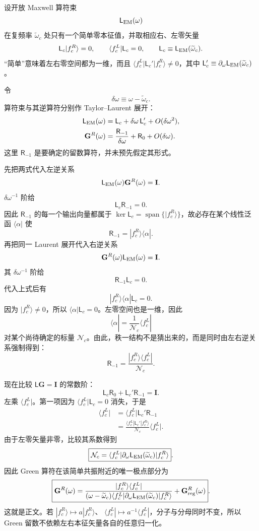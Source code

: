 \begin{derivation}
设开放 Maxwell 算符束
\[
\mathsf L_{\rm EM}(\omega)
\]
在复频率 \(\widetilde\omega_c\) 处只有一个简单零本征值，并取相应右、左零矢量
\[
\mathsf L_c|f_c^R\rangle=0,
\qquad
\langle f_c^L|\mathsf L_c=0,
\qquad
\mathsf L_c\equiv\mathsf L_{\rm EM}(\widetilde\omega_c).
\]
“简单”意味着左右零空间都为一维，而且
\(\langle f_c^L|\mathsf L_c'|f_c^R\rangle\neq0\)，其中
\(\mathsf L_c'\equiv\partial_\omega\mathsf L_{\rm EM}(\widetilde\omega_c)\)。

令
\[
\delta\omega\equiv\omega-\widetilde\omega_c.
\]
算符束与其逆算符分别作 Taylor--Laurent 展开：
\begin{align*}
\mathsf L_{\rm EM}(\omega)
&=\mathsf L_c+\delta\omega\,\mathsf L_c'
+O(\delta\omega^2),\\
\mathbf G^R(\omega)
&=\frac{\mathsf R_{-1}}{\delta\omega}
+\mathsf R_0+O(\delta\omega).
\end{align*}
这里 \(\mathsf R_{-1}\) 是要确定的留数算符，并未预先假定其形式。

先把两式代入左逆关系
\[
\mathsf L_{\rm EM}(\omega)\mathbf G^R(\omega)=\mathbf I.
\]
\(\delta\omega^{-1}\) 阶给
\[
\mathsf L_c\mathsf R_{-1}=0.
\]
因此 \(\mathsf R_{-1}\) 的每一个输出向量都属于
\(\ker\mathsf L_c=\operatorname{span}\{|f_c^R\rangle\}\)，故必存在某个线性泛函
\(\langle\alpha|\) 使
\[
\mathsf R_{-1}=|f_c^R\rangle\langle\alpha|.
\]
再把同一 Laurent 展开代入右逆关系
\[
\mathbf G^R(\omega)\mathsf L_{\rm EM}(\omega)=\mathbf I.
\]
其 \(\delta\omega^{-1}\) 阶给
\[
\mathsf R_{-1}\mathsf L_c=0.
\]
代入上式后有
\[
|f_c^R\rangle\langle\alpha|\mathsf L_c=0.
\]
因为 \(|f_c^R\rangle\neq0\)，所以
\(\langle\alpha|\mathsf L_c=0\)。左零空间也是一维，因此
\[
\langle\alpha|=\frac{1}{\mathcal N_c}\langle f_c^L|
\]
对某个尚待确定的标量 \(\mathcal N_c\)。由此，秩一结构不是猜出来的，而是同时由左右逆关系强制得到：
\[
\mathsf R_{-1}
=\frac{|f_c^R\rangle\langle f_c^L|}{\mathcal N_c}.
\]

现在比较 \(\mathsf L\mathbf G=\mathbf I\) 的常数阶：
\[
\mathsf L_c\mathsf R_0
+\mathsf L_c'\mathsf R_{-1}
=\mathbf I.
\]
左乘 \(\langle f_c^L|\)。第一项因为
\(\langle f_c^L|\mathsf L_c=0\) 消失，于是
\begin{align*}
\langle f_c^L|
&=\langle f_c^L|\mathsf L_c'\mathsf R_{-1}\\
&=\frac{\langle f_c^L|\mathsf L_c'|f_c^R\rangle}
{\mathcal N_c}\langle f_c^L|.
\end{align*}
由于左零矢量非零，比较其系数得到
\[
\boxed{
\mathcal N_c
=\langle f_c^L|
\partial_\omega\mathsf L_{\rm EM}(\widetilde\omega_c)
|f_c^R\rangle }.
\]
因此 Green 算符在该简单共振附近的唯一极点部分为
\[
\boxed{
\mathbf G^R(\omega)
=\frac{|f_c^R\rangle\langle f_c^L|}
{(\omega-\widetilde\omega_c)
\langle f_c^L|\partial_\omega\mathsf L_{\rm EM}(\widetilde\omega_c)|f_c^R\rangle}
+\mathbf G_{\rm reg}^R(\omega)}.
\]
这就是正文。若
\(|f_c^R\rangle\mapsto a|f_c^R\rangle\)、
\(\langle f_c^L|\mapsto a^{-1}\langle f_c^L|\)，分子与分母同时不变，所以 Green 留数不依赖左右本征矢量各自的任意归一化。


\end{derivation}
